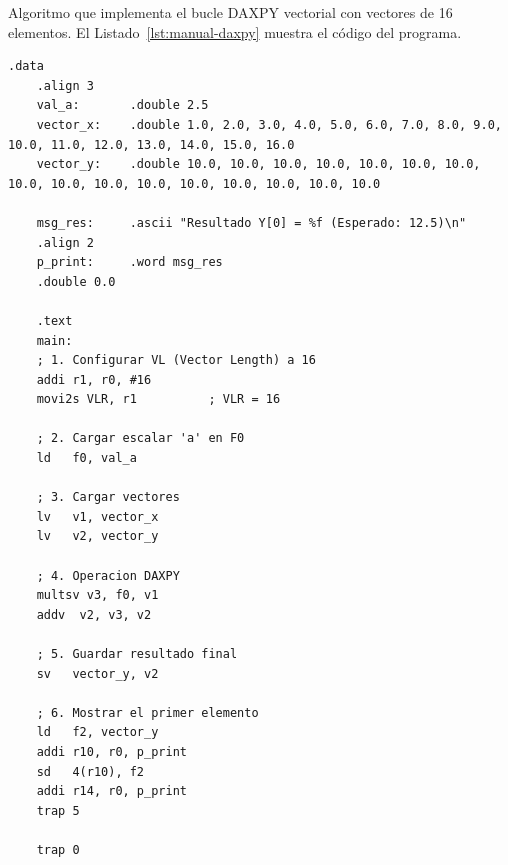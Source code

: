 \documentclass[../main.tex]{subfiles}
\begin{document}
Algoritmo que implementa el bucle DAXPY vectorial con vectores de 16 elementos. El Listado~\ref{lst:manual-daxpy} muestra el código del programa.

\begin{lstlisting}[caption={DAXPY vectorial.},label={lst:manual-daxpy}]
	.data
	.align 3
	val_a:       .double 2.5
	vector_x:    .double 1.0, 2.0, 3.0, 4.0, 5.0, 6.0, 7.0, 8.0, 9.0, 10.0, 11.0, 12.0, 13.0, 14.0, 15.0, 16.0
	vector_y:    .double 10.0, 10.0, 10.0, 10.0, 10.0, 10.0, 10.0, 10.0, 10.0, 10.0, 10.0, 10.0, 10.0, 10.0, 10.0, 10.0
	
	msg_res:     .ascii "Resultado Y[0] = %f (Esperado: 12.5)\n"
	.align 2
	p_print:     .word msg_res
	.double 0.0
	
	.text
	main:
	; 1. Configurar VL (Vector Length) a 16
	addi r1, r0, #16
	movi2s VLR, r1          ; VLR = 16
	
	; 2. Cargar escalar 'a' en F0
	ld   f0, val_a
	
	; 3. Cargar vectores
	lv   v1, vector_x
	lv   v2, vector_y
	
	; 4. Operacion DAXPY
	multsv v3, f0, v1
	addv  v2, v3, v2
	
	; 5. Guardar resultado final
	sv   vector_y, v2
	
	; 6. Mostrar el primer elemento
	ld   f2, vector_y
	addi r10, r0, p_print
	sd   4(r10), f2
	addi r14, r0, p_print
	trap 5
	
	trap 0
\end{lstlisting}
\end{document}
